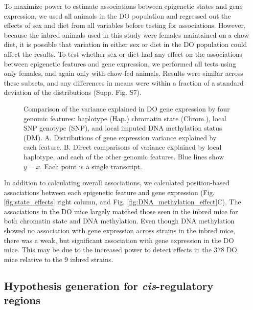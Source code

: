 \documentclass[
  11pt,
]{article}
\begin{document}
To maximize power to estimate associations between epigenetic states and
gene expression, we used all animals in the DO population and regressed
out the effects of sex and diet from all variables before testing for
associations. However, because the inbred animals used in this study
were females maintained on a chow diet, it is possible that variation in
either sex or diet in the DO population could affect the results. To
test whether sex or diet had any effect on the associations between
epigenetic features and gene expression, we performed all tests using
only females, and again only with chow-fed animals. Results were similar
across these subsets, and any differences in means were within a
fraction of a standard deviation of the distributions (Supp. Fig. S7).

\begin{figure}[ht!]
\caption{Comparison of the variance explained in DO gene expression
by four genomic features: haplotype (Hap.) chromatin state (Chrom.), 
local SNP genotype (SNP), and local imputed DNA methylation status 
(DM). A. Distributions of gene expression variance explained by each 
feature. B. Direct comparisons of variance explained by local 
haplotype, and each of the other genomic features. Blue lines 
show $y = x$. Each point is a single transcript.}
\label{fig:effect_distrubutions}
\end{figure}

In addition to calculating overall associations, we calculated
position-based associations between each epigenetic feature and gene
expression (Fig. \ref{fig:state_effects} right column, and Fig.
\ref{fig:DNA_methylation_effect}C). The associations in the DO mice
largely matched those seen in the inbred mice for both chromatin state
and DNA methylation. Even though DNA methylation showed no association
with gene expression across strains in the inbred mice, there was a
weak, but significant association with gene expression in the DO mice.
This may be due to the increased power to detect effects in the 378 DO
mice relative to the 9 inbred strains.

\hypertarget{hypothesis-generation-for--regulatory-regions}{%
\subsection{\texorpdfstring{Hypothesis generation for
\textit{cis}-regulatory
regions}{Hypothesis generation for -regulatory regions}}\label{hypothesis-generation-for--regulatory-regions}}
\end{document}
